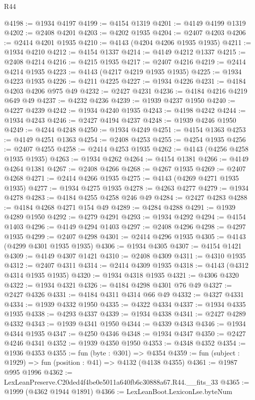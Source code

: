 \begin{lexlean}{R44}
\begin{coremodule}
@4198 := @1934 @4197
@4199 := @4154 @1319
@4201 := @4149 @4199 @1319
@4202 := @2408 @4201
@4203 := @4202 @1935
@4204 := @2407 @4203
@4206 := @2414 @4201 @1935
@4210 := @4143 (@4204 @4206 @1935 @1935)
@4211 := @1934 @4210
@4212 := @4154 @1337
@4214 := @4149 @4212 @1337
@4215 := @2408 @4214
@4216 := @4215 @1935
@4217 := @2407 @4216
@4219 := @2414 @4214 @1935
@4223 := @4143 (@4217 @4219 @1935 @1935)
@4225 := @1934 @4223 @1935
@4226 := @4211 @4225
@4227 := @1934 @4226
@4231 := @4184 @4203 @4206 @975 @49
@4232 := @2427 @4231
@4236 := @4184 @4216 @4219 @649 @49
@4237 := @4232 @4236
@4239 := @1939 @4237 @1950
@4240 := @4227 @4239
@4242 := @1934 @4240 @1935
@4243 := @4198 @4242
@4244 := @1934 @4243
@4246 := @2427 @4194 @4237
@4248 := @1939 @4246 @1950
@4249 := @4244 @4248
@4250 := @1934 @4249
@4251 := @4154 @1363
@4253 := @4149 @4251 @1363
@4254 := @2408 @4253
@4255 := @4254 @1935
@4256 := @2407 @4255
@4258 := @2414 @4253 @1935
@4262 := @4143 (@4256 @4258 @1935 @1935)
@4263 := @1934 @4262
@4264 := @4154 @1381
@4266 := @4149 @4264 @1381
@4267 := @2408 @4266
@4268 := @4267 @1935
@4269 := @2407 @4268
@4271 := @2414 @4266 @1935
@4275 := @4143 (@4269 @4271 @1935 @1935)
@4277 := @1934 @4275 @1935
@4278 := @4263 @4277
@4279 := @1934 @4278
@4283 := @4184 @4255 @4258 @246 @49
@4284 := @2427 @4283
@4288 := @4184 @4268 @4271 @154 @49
@4289 := @4284 @4288
@4291 := @1939 @4289 @1950
@4292 := @4279 @4291
@4293 := @1934 @4292
@4294 := @4154 @1403
@4296 := @4149 @4294 @1403
@4297 := @2408 @4296
@4298 := @4297 @1935
@4299 := @2407 @4298
@4301 := @2414 @4296 @1935
@4305 := @4143 (@4299 @4301 @1935 @1935)
@4306 := @1934 @4305
@4307 := @4154 @1421
@4309 := @4149 @4307 @1421
@4310 := @2408 @4309
@4311 := @4310 @1935
@4312 := @2407 @4311
@4314 := @2414 @4309 @1935
@4318 := @4143 (@4312 @4314 @1935 @1935)
@4320 := @1934 @4318 @1935
@4321 := @4306 @4320
@4322 := @1934 @4321
@4326 := @4184 @4298 @4301 @76 @49
@4327 := @2427 @4326
@4331 := @4184 @4311 @4314 @66 @49
@4332 := @4327 @4331
@4334 := @1939 @4332 @1950
@4335 := @4322 @4334
@4337 := @1934 @4335 @1935
@4338 := @4293 @4337
@4339 := @1934 @4338
@4341 := @2427 @4289 @4332
@4343 := @1939 @4341 @1950
@4344 := @4339 @4343
@4346 := @1934 @4344 @1935
@4347 := @4250 @4346
@4348 := @1934 @4347
@4350 := @2427 @4246 @4341
@4352 := @1939 @4350 @1950
@4353 := @4348 @4352
@4354 := @1936 @4353
@4355 := fun (byte : @301) => @4354
@4359 := fun (subject : @1929) => fun (position : @41) => @4132 (@4138 @4355)
@4361 := @1987 @995 @1996
@4362 := LexLeanPreserve.C20ded4f4be0e5011a640fb6c30888a67.R44.__fits_33
@4365 := @1999 (@4362 @1944 @1891)
@4366 := LexLeanBoot.LexiconLse.byteNum

\end{coremodule}
\end{lexlean}
